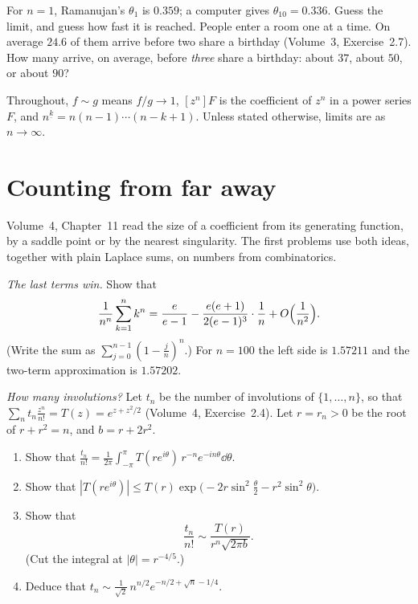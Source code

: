 \begin{think}
For $n=1$, Ramanujan's $\theta_1$ is $0.359$; a computer gives $\theta_{10}=0.336$. Guess the limit, and guess how fast it is reached. People
enter a room one at a time. On average $24.6$ of them arrive before two share a birthday (Volume~3, Exercise~2.7). How many arrive,
on average, before \emph{three} share a birthday: about $37$, about $50$, or about $90$?
\end{think}

Throughout, $f\sim g$ means $f/g\to1$, $[z^n]F$ is the coefficient of $z^n$ in a power series $F$, and $n^{\underline k}=n(n-1)\cdots(n-k+1)$.
Unless stated otherwise, limits are as $n\to\infty$.

\section{Counting from far away}

Volume~4, Chapter~11 read the size of a coefficient from its generating function, by a saddle point or by the nearest singularity.
The first problems use both ideas, together with plain Laplace sums, on numbers from combinatorics.

\begin{exercise}[$\star$]\label{pb:powersum}
\emph{The last terms win.} Show that
\[
\frac1{n^n}\sum_{k=1}^nk^n=\frac e{e-1}-\frac{e(e+1)}{2(e-1)^3}\cdot\frac1n+O\Bigl(\frac1{n^2}\Bigr).
\]
(Write the sum as $\sum_{j=0}^{n-1}(1-\frac jn)^n$.) For $n=100$ the left side is $1.57211$ and the two-term approximation is $1.57202$.
\end{exercise}

\begin{exercise}[$\star\star\star$]\label{pb:involasym}
\emph{How many involutions?} Let $t_n$ be the number of involutions of $\{1,\dots,n\}$, so that $\sum_nt_n\frac{z^n}{n!}=T(z)=e^{z+z^2/2}$ (Volume~4,
Exercise~2.4). Let $r=r_n>0$ be the root of $r+r^2=n$, and $b=r+2r^2$.
\begin{enumerate}[label=(\alph*)]
\item Show that $\frac{t_n}{n!}=\frac1{2\pi}\int_{-\pi}^\pi T(re^{i\theta})\,r^{-n}e^{-in\theta}\dd\theta$.
\item Show that $|T(re^{i\theta})|\le T(r)\exp\bigl(-2r\sin^2\frac\theta2-r^2\sin^2\theta\bigr)$.
\item Show that
\[
\frac{t_n}{n!}\sim\frac{T(r)}{r^n\sqrt{2\pi b}}.
\]
(Cut the integral at $|\theta|=r^{-4/5}$.)
\item Deduce that $t_n\sim\frac1{\sqrt2}\,n^{n/2}e^{-n/2+\sqrt n-1/4}$.
\end{enumerate}
\end{exercise}

